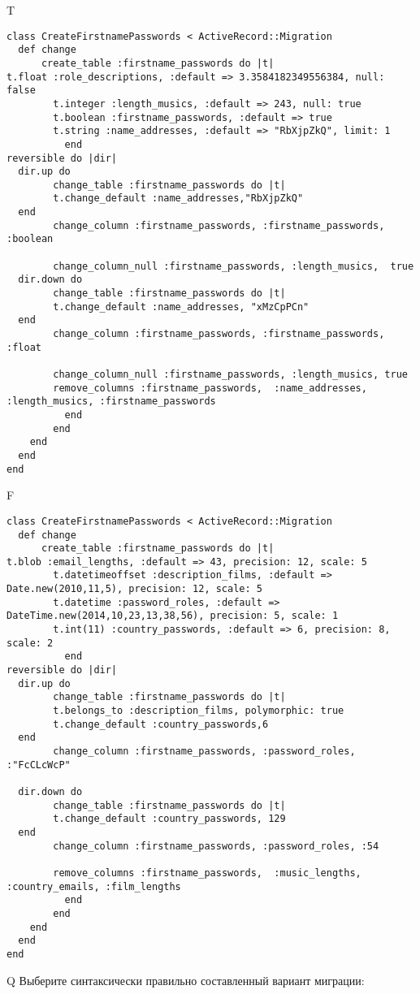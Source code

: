 T
\begin{verbatim}
class CreateFirstnamePasswords < ActiveRecord::Migration
  def change
	  create_table :firstname_passwords do |t|
t.float :role_descriptions, :default => 3.3584182349556384, null: false
		t.integer :length_musics, :default => 243, null: true
		t.boolean :firstname_passwords, :default => true
		t.string :name_addresses, :default => "RbXjpZkQ", limit: 1
		  end
reversible do |dir|
  dir.up do
		change_table :firstname_passwords do |t|
		t.change_default :name_addresses,"RbXjpZkQ"
  end
 		change_column :firstname_passwords, :firstname_passwords, :boolean
   
		change_column_null :firstname_passwords, :length_musics,  true
  dir.down do
		change_table :firstname_passwords do |t|
		t.change_default :name_addresses, "xMzCpPCn"
  end
 		change_column :firstname_passwords, :firstname_passwords, :float
   
		change_column_null :firstname_passwords, :length_musics, true
 		remove_columns :firstname_passwords,  :name_addresses, :length_musics, :firstname_passwords 
	      end
	    end
    end 
  end
end

\end{verbatim}

F
\begin{verbatim}
class CreateFirstnamePasswords < ActiveRecord::Migration
  def change
	  create_table :firstname_passwords do |t|
t.blob :email_lengths, :default => 43, precision: 12, scale: 5
		t.datetimeoffset :description_films, :default => Date.new(2010,11,5), precision: 12, scale: 5
		t.datetime :password_roles, :default => DateTime.new(2014,10,23,13,38,56), precision: 5, scale: 1
		t.int(11) :country_passwords, :default => 6, precision: 8, scale: 2
		  end
reversible do |dir|
  dir.up do
		change_table :firstname_passwords do |t|
		t.belongs_to :description_films, polymorphic: true
 		t.change_default :country_passwords,6
  end
 		change_column :firstname_passwords, :password_roles, :"FcCLcWcP"
   
  dir.down do
		change_table :firstname_passwords do |t|
		t.change_default :country_passwords, 129
  end
 		change_column :firstname_passwords, :password_roles, :54
   
		remove_columns :firstname_passwords,  :music_lengths, :country_emails, :film_lengths 
	      end
	    end
    end 
  end
end

\end{verbatim}

Q
Выберите синтаксически правильно составленный вариант миграции:

